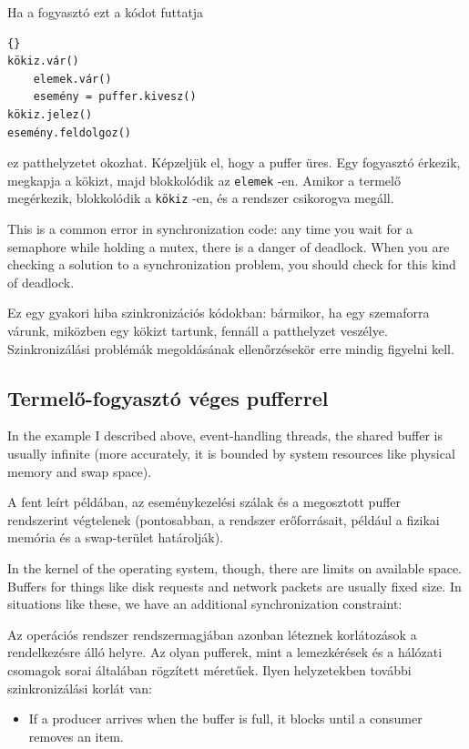 \documentclass{book}
\begin{document}
Ha a fogyasztó ezt a kódot futtatja

\begin{lstlisting}[title={Elrontott fogyasztó megoldás}]{}
kökiz.vár()
    elemek.vár()
    esemény = puffer.kivesz()
kökiz.jelez()
esemény.feldolgoz()
\end{lstlisting}
%
ez patthelyzetet okozhat. Képzeljük el, hogy a puffer üres.
Egy fogyasztó érkezik, megkapja a kökizt, majd blokkolódik az
{\tt elemek} -en. Amikor a termelő megérkezik, blokkolódik a {\tt kökiz} -en,
és a rendszer csikorogva megáll.
  
This is a common error in synchronization code: any time
you wait for a semaphore while holding a mutex, there is
a danger of deadlock.  When you are checking a solution to
a synchronization problem, you should check for this kind
of deadlock.
  
Ez egy gyakori hiba szinkronizációs kódokban:
bármikor, ha egy szemaforra várunk, miközben egy kökizt tartunk,
fennáll a patthelyzet veszélye. Szinkronizálási problémák megoldásának
ellenőrzésekör erre mindig figyelni kell.


\subsection{Termelő-fogyasztó véges pufferrel}

In the example I described above, event-handling threads,
the shared buffer is usually infinite (more accurately, it is
bounded by system resources like physical memory and swap
space).

A fent leírt példában, az eseménykezelési szálak és a
megosztott puffer rendszerint végtelenek (pontosabban, a rendszer erőforrásait,
például a fizikai memória és a swap-terület határolják).

In the kernel of the operating system, though, there are
limits on available space.  Buffers for things like disk
requests and network packets are usually fixed size.  In
situations like these, we have an additional synchronization
constraint:

Az operációs rendszer rendszermagjában azonban léteznek korlátozások a rendelkezésre álló helyre.
Az olyan pufferek, mint a lemezkérések és a hálózati csomagok sorai általában rögzített méretűek.
Ilyen helyzetekben további szinkronizálási korlát van:

\begin{itemize}

\item If a producer arrives when the buffer is full, it
blocks until a consumer removes an item.

\end{itemize}
\end{document}
